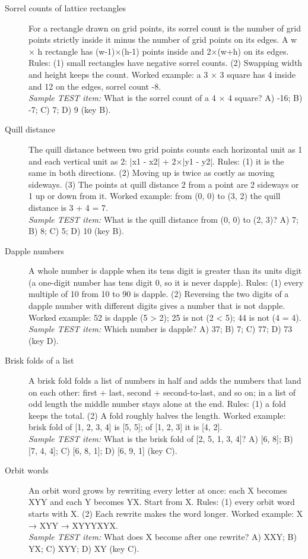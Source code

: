 \begin{description}
\item[Sorrel counts of lattice rectangles] For a rectangle drawn on grid points, its sorrel count is the number of grid points strictly inside it minus the number of grid points on its edges. A w × h rectangle has (w-1)×(h-1) points inside and 2×(w+h) on its edges. Rules: (1) small rectangles have negative sorrel counts. (2) Swapping width and height keeps the count. Worked example: a 3 × 3 square has 4 inside and 12 on the edges, sorrel count -8.\\ \emph{Sample TEST item:} What is the sorrel count of a 4 × 4 square? A) -16; B) -7; C) 7; D) 9 (key B).
\item[Quill distance] The quill distance between two grid points counts each horizontal unit as 1 and each vertical unit as 2: |x1 - x2| + 2×|y1 - y2|. Rules: (1) it is the same in both directions. (2) Moving up is twice as costly as moving sideways. (3) The points at quill distance 2 from a point are 2 sideways or 1 up or down from it. Worked example: from (0, 0) to (3, 2) the quill distance is 3 + 4 = 7.\\ \emph{Sample TEST item:} What is the quill distance from (0, 0) to (2, 3)? A) 7; B) 8; C) 5; D) 10 (key B).
\item[Dapple numbers] A whole number is dapple when its tens digit is greater than its units digit (a one-digit number has tens digit 0, so it is never dapple). Rules: (1) every multiple of 10 from 10 to 90 is dapple. (2) Reversing the two digits of a dapple number with different digits gives a number that is not dapple. Worked example: 52 is dapple (5 > 2); 25 is not (2 < 5); 44 is not (4 = 4).\\ \emph{Sample TEST item:} Which number is dapple? A) 37; B) 7; C) 77; D) 73 (key D).
\item[Brisk folds of a list] A brisk fold folds a list of numbers in half and adds the numbers that land on each other: first + last, second + second-to-last, and so on; in a list of odd length the middle number stays alone at the end. Rules: (1) a fold keeps the total. (2) A fold roughly halves the length. Worked example: brisk fold of [1, 2, 3, 4] is [5, 5]; of [1, 2, 3] it is [4, 2].\\ \emph{Sample TEST item:} What is the brisk fold of [2, 5, 1, 3, 4]? A) [6, 8]; B) [7, 4, 4]; C) [6, 8, 1]; D) [6, 9, 1] (key C).
\item[Orbit words] An orbit word grows by rewriting every letter at once: each X becomes XYY and each Y becomes YX. Start from X. Rules: (1) every orbit word starts with X. (2) Each rewrite makes the word longer. Worked example: X → XYY → XYYYXYX.\\ \emph{Sample TEST item:} What does X become after one rewrite? A) XXY; B) YX; C) XYY; D) XY (key C).

\end{description}
